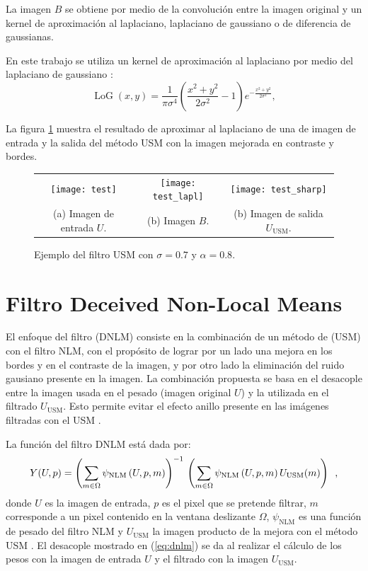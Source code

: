 La imagen $B$ se obtiene por medio de la convolución entre la imagen original y un kernel de aproximación al laplaciano, laplaciano de gaussiano o de diferencia de gaussianas.


En este trabajo se utiliza un kernel de aproximación al laplaciano por medio del laplaciano de gaussiano \cite{sotak1989laplacian}:
%
\begin{equation}
\label{eq:log}
\operatorname{LoG}(x,y) = \frac{1}{\pi\sigma^4}\left(\frac{x^2+y^2}{2\sigma^2} - 1\right)e^{-\frac{x^2+y^2}{2\sigma^2}},
\end{equation}

La figura \ref{fig:exampleUSM} muestra el resultado de aproximar al laplaciano de una de imagen de entrada y la salida del método USM con la imagen mejorada en contraste y bordes. 

\begin{figure}[htb]
\centering
\begin{tabular}{ccc}
  \texttt{[image: test]} &
  \texttt{[image: test\_lapl]} &
  \texttt{[image: test\_sharp]}\\
  (a) Imagen de entrada $U$. &
  (b) Imagen $B$. &
  (b) Imagen de salida $U_{\textrm{USM}}$.\\
\end{tabular}
\caption{Ejemplo del filtro USM con $\sigma = 0.7$ y $\alpha = 0.8$. \label{fig:exampleUSM}}
\end{figure}


\section{Filtro Deceived Non-Local Means}
\label{ch:marco_dnlm}


El enfoque del filtro  (DNLM) consiste en la combinación de un método de  (USM) con el filtro NLM, con el propósito de lograr por un lado una mejora en los bordes y en el contraste de la imagen, y por otro lado la eliminación del ruido gausiano  presente en la imagen. La combinación propuesta se basa en el desacople entre la imagen usada en el pesado (imagen original $U$) y la utilizada en el filtrado $U_{\textrm{USM}}$. Esto permite evitar el efecto anillo presente en las im\'agenes filtradas con el USM \cite{calderon2015dewaff}.

La función del filtro DNLM est\'a dada por:
%
\begin{equation}
\label{eq:dnlm}
Y(U,p)=\left(\sum_{m\in \Omega}\psi_{\textrm{NLM}}\left(U, p, m\right)\right)^{-1} \\ \left(\sum_{m\in \Omega}\psi_{\textrm{NLM}}\left(U, p, m\right)U_{\textrm{USM}}(m)\right) \enspace ,
\end{equation}
%
donde $U$ es la imagen de entrada, $p$ es el pixel que se pretende filtrar, $m$ corresponde a un pixel contenido en la ventana deslizante $\Omega$, $\psi_{\textrm{NLM}}$ es una función de pesado del filtro NLM y $U_{\textrm{USM}}$ la imagen producto de la mejora con el método USM \cite{calderon2015dewaff}. El desacople mostrado en (\ref{eq:dnlm}) se da al realizar el c\'alculo de los pesos con la imagen de entrada $U$ y el filtrado con la imagen $U_{\textrm{USM}}$.

